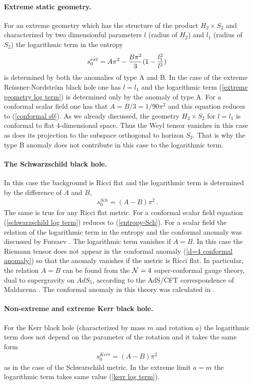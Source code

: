 \documentclass[12pt]{article}
\def\be{\begin{eqnarray}}
\def\ee{\end{eqnarray}}
\def\lb{\label}
\def\o{\over}
\begin{document}
\paragraph*{Extreme static geometry.} For an extreme geometry which has the structure of the product $H_2\times S_2$ and characterized by two dimensionful parameters
$l$ (radius of $H_2$) and $l_1$ (radius of $S_2$) the logarithmic term in the entropy 
\be
s_0^{ext}=A\pi^2 -{B\pi^2\o 3}(1-{l_1^2\o l^2})\, 
\lb{extreme geometry log term}
\ee
is determined by both the anomalies of type A and B. In the case of the extreme Reissner-Nordstr\"{o}m black hole one has $l=l_1$ and the logarithmic term (\ref{extreme geometry log term}) is determined only by the anomaly of type A. For a conformal scalar field one has that $A=B/3=1/90\pi^2$ and this equation reduces to (\ref{conformal s0}). 
As we already discussed, the geometry $H_2\times S_2$ for $l=l_1$ is conformal to flat 4-dimensional space. Thus the Weyl tensor vanishes in this case as does its projection to the 
subspace orthogonal to horizon $S_2$. That is why the type B anomaly does not contribute in this case to the logarithmic term.


\paragraph*{The Schwarzschild black hole.} In this case the background is Ricci flat and the logarithmic term  is determined by the difference of $A$ and $B$,
\be
s^{Sch}_0=(A-B)\pi^2\, .
\lb{schwarzschild log term}
\ee
The same is true for any Ricci flat metric.  For a conformal scalar field equation (\ref{schwarzschild log term}) reduces to (\ref{entropy-Sch}).
For a scalar field the relation of the logarithmic term in the entropy and the conformal anomaly was discussed by Fursaev \cite{Fursaev:1994te}.
 The logarithmic term vanishes if $A=B$. In this case the Riemann tensor does not appear in the conformal anomaly (\ref{d=4 conformal anomaly}) so that the anomaly vanishes if the metric is Ricci flat.  In particular, the relation $A=B$ can be found from the  ${\cal N}=4$ super-conformal gauge theory, dual to  supergravity on $AdS_5$, according to the AdS/CFT correspondence of Maldacena \cite{Maldacena:1997re}. The conformal anomaly in this theory was calculated in \cite{Henningson:1998gx}. 

\paragraph*{Non-extreme and extreme Kerr black hole.} For the Kerr black hole (characterized by mass $m$ and rotation $a$) the logarithmic term does not depend on the parameter of the rotation and it takes the same form
\be
s^{Kerr}_0=(A-B)\pi^2 \, 
\lb{kerr log term}
\ee
as in the case of the Schwarschild metric. In the extreme limit $a=m$ the logarithmic term takes same value (\ref{kerr log term}).
\end{document}
